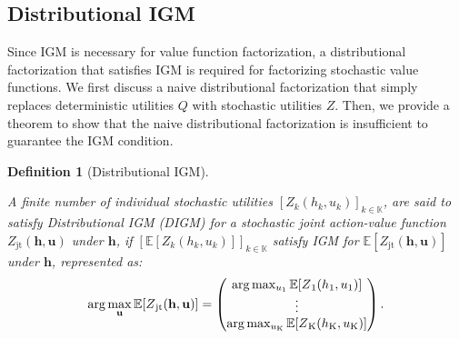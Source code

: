 \documentclass{article}
\newcommand{\jointaction}{\mathbf{u}}
\newcommand{\action}{u}
\newcommand{\jointobservationhistory}{\mathbf{h}}
\newcommand{\observationhistory}{h}
\newcommand{\agentspace}{\mathbb{K}}
\newcommand{\agentcounter}{k}
\newcommand{\numberofagents}{\mathrm{K}}
\newcommand{\utilityexp}{Q}
\newcommand{\utility}{Z}
\newcommand{\joint}{\mathrm{jt}}
\newcommand{\digm}{\textit{DIGM}}
\newcounter{definition}
\newtheorem{definition}[definition]{Definition}
\begin{document}
\subsection{Distributional IGM}
\label{subsec:methodology_distributional_igm_condition}

Since IGM is necessary for value function factorization, a distributional factorization that satisfies IGM is required for factorizing stochastic value functions. We first discuss a naive distributional factorization that simply replaces deterministic utilities $\utilityexp$ with stochastic utilities $\utility$. Then, we provide a theorem to show that the naive distributional factorization is insufficient to guarantee the IGM condition.

\begin{definition}[Distributional IGM]
\label{def:distributional_igm}

A finite number of individual stochastic utilities $[\utility_{\agentcounter}(\observationhistory_{\agentcounter}, \action_{\agentcounter})]_{\agentcounter \in \agentspace}$, are said to satisfy Distributional IGM (\digm{}) for a stochastic joint action-value function $\utility_{\joint}(\jointobservationhistory, \jointaction{})$ under $\jointobservationhistory$, if $[\mathbb{E}[\utility_{\agentcounter}(\observationhistory_{\agentcounter}, u_{\agentcounter})]]_{\agentcounter \in \agentspace}$ satisfy IGM for $\mathbb{E}[\utility_{\joint}(\jointobservationhistory, \jointaction{})]$ under $\jointobservationhistory$, represented as:
\begin{equation}
\arg\max_\jointaction{} \mathbb{E}[\utility{}_{\joint{}}(\jointobservationhistory{},\jointaction{})] =
\begin{pmatrix}
\arg\max_{\action{}_1} \mathbb{E}[\utility{}_1(\observationhistory{}_1,\action{}_1)]\\
\vdots \\
\arg\max_{\action{}_\numberofagents{}} \mathbb{E}[\utility{}_\numberofagents{}(\observationhistory{}_\numberofagents{},\action{}_\numberofagents{})]
\end{pmatrix}.
\notag{}
\end{equation}
\end{definition} 
\end{document}
